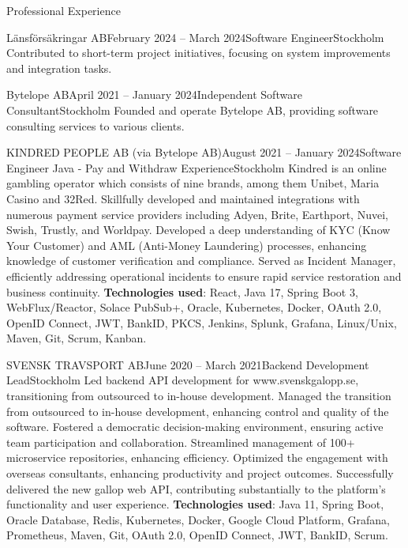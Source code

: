 \documentclass{resume}
\begin{document}
\begin{rSection}{Professional Experience}
\begin{rSubsection}{Länsförsäkringar AB}{February 2024 -- March 2024}{Software Engineer}{Stockholm}
\bItem Contributed to short-term project initiatives, focusing on system improvements and integration tasks.
\end{rSubsection}

\begin{rSubsection}{Bytelope AB}{April 2021 -- January 2024}{Independent Software Consultant}{Stockholm}
\bItem Founded and operate Bytelope AB, providing software consulting services to various clients.
\end{rSubsection}

\begin{rClientSubsection}{KINDRED PEOPLE AB (via Bytelope AB)}{August 2021 -- January 2024}{Software Engineer Java - Pay and Withdraw Experience}{Stockholm}
\bItem Kindred is an online gambling operator which consists of nine brands, among them Unibet, Maria Casino and 32Red.
\bItem Skillfully developed and maintained integrations with numerous payment service providers including Adyen, Brite, Earthport, Nuvei, Swish, Trustly, and Worldpay.
\bItem Developed a deep understanding of KYC (Know Your Customer) and AML (Anti-Money Laundering) processes, enhancing knowledge of customer verification and compliance.
\bItem Served as Incident Manager, efficiently addressing operational incidents to ensure rapid service restoration and business continuity.
\bItem \textbf{Technologies used}: React, Java 17, Spring Boot 3, WebFlux/Reactor, Solace PubSub+, Oracle, Kubernetes, Docker, OAuth 2.0, OpenID Connect, JWT, BankID, PKCS, Jenkins, Splunk, Grafana, Linux/Unix, Maven, Git, Scrum, Kanban.
\end{rClientSubsection}

\begin{rSubsection}{SVENSK TRAVSPORT AB}{June 2020 -- March 2021}{Backend Development Lead}{Stockholm}
\bItem Led backend API development for www.svenskgalopp.se, transitioning from outsourced to in-house development.
\bItem Managed the transition from outsourced to in-house development, enhancing control and quality of the software.
\bItem Fostered a democratic decision-making environment, ensuring active team participation and collaboration.
\bItem Streamlined management of 100+ microservice repositories, enhancing efficiency.
\bItem Optimized the engagement with overseas consultants, enhancing productivity and project outcomes.
\bItem Successfully delivered the new gallop web API, contributing substantially to the platform's functionality and user experience.
\bItem \textbf{Technologies used}: Java 11, Spring Boot, Oracle Database, Redis, Kubernetes, Docker, Google Cloud Platform, Grafana, Prometheus, Maven, Git, OAuth 2.0, OpenID Connect, JWT, BankID, Scrum.
\end{rSubsection}


\end{rSection}
\end{document}
